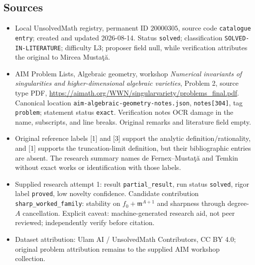 \documentclass[11pt]{article}
\begin{document}
\subsection{Sources}
\begin{itemize}
\item Local UnsolvedMath registry, permanent ID $20000305$, source code \texttt{catalogue entry}; created and updated 2026-08-14. Status \texttt{solved}; classification \texttt{SOLVED-IN-LITERATURE}; difficulty L3; proposer field null, while verification attributes the original to Mircea Musta\c t\u a.
\item AIM Problem Lists, Algebraic geometry, workshop \emph{Numerical invariants of singularities and higher-dimensional algebraic varieties}, Problem 2, source type PDF, \url{https://aimath.org/WWN/singularvariety/problems_final.pdf}. Canonical location \texttt{aim-algebraic-geometry-notes.json}, \texttt{notes[304]}, tag \texttt{problem}; statement status \texttt{exact}. Verification notes OCR damage in the name, subscripts, and line breaks. Original remarks and literature field empty.
\item Original reference labels [1] and [3] support the analytic definition/rationality, and [1] supports the truncation-limit definition, but their bibliographic entries are absent. The research summary names de Fernex--Musta\c t\u a and Temkin without exact works or identification with those labels.
\item Supplied research attempt 1: result \texttt{partial\_result}, run status \texttt{solved}, rigor label \texttt{proved}, low novelty confidence. Candidate contribution \texttt{sharp\_worked\_family}: stability on $f_0+\mathfrak m^{A+1}$ and sharpness through degree-$A$ cancellation. Explicit caveat: machine-generated research aid, not peer reviewed; independently verify before citation.
\item Dataset attribution: Ulam AI / UnsolvedMath Contributors, CC BY 4.0; original problem attribution remains to the supplied AIM workshop collection.
\end{itemize}
\end{document}
